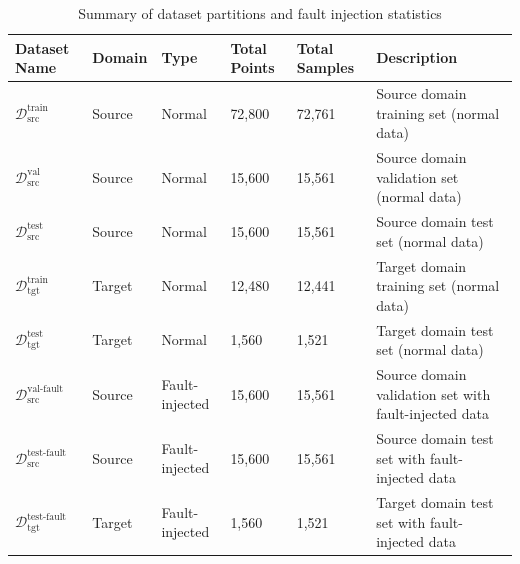 \documentclass[a4paper,10pt]{cas-sc}%
\begin{document}
\begin{table}[pos=htbp]
	\centering
	\caption{Summary of dataset partitions and fault injection statistics}
	\label{tab:dataset_sample_fault_summary}
	\renewcommand{\arraystretch}{1.2}
	\begin{tabular}{lllllp{5.2cm}<{\raggedright\arraybackslash}}
		\toprule
		\textbf{Dataset Name}                              & \textbf{Domain} & \textbf{Type}  & \textbf{Total Points} & \textbf{Total Samples} & \textbf{Description}                                  \\
		\midrule
		\( \mathcal{D}_{\text{src}}^{\text{train}} \)      & Source          & Normal         & 72,800                & 72,761                 & Source domain training set (normal data)              \\
		\( \mathcal{D}_{\text{src}}^{\text{val}} \)        & Source          & Normal         & 15,600                & 15,561                 & Source domain validation set (normal data)            \\
		\( \mathcal{D}_{\text{src}}^{\text{test}} \)       & Source          & Normal         & 15,600                & 15,561                 & Source domain test set (normal data)                  \\
		\( \mathcal{D}_{\text{tgt}}^{\text{train}} \)      & Target          & Normal         & 12,480                & 12,441                 & Target domain training set (normal data)              \\
		\( \mathcal{D}_{\text{tgt}}^{\text{test}} \)       & Target          & Normal         & 1,560                 & 1,521                  & Target domain test set (normal data)                  \\
		\midrule
		\( \mathcal{D}_{\text{src}}^{\text{val-fault}} \)  & Source          & Fault-injected & 15,600                & 15,561                 & Source domain validation set with fault-injected data \\
		\( \mathcal{D}_{\text{src}}^{\text{test-fault}} \) & Source          & Fault-injected & 15,600                & 15,561                 & Source domain test set with fault-injected data       \\
		\( \mathcal{D}_{\text{tgt}}^{\text{test-fault}} \) & Target          & Fault-injected & 1,560                 & 1,521                  & Target domain test set with fault-injected data       \\
		\bottomrule
	\end{tabular}
\end{table}
\end{document}
